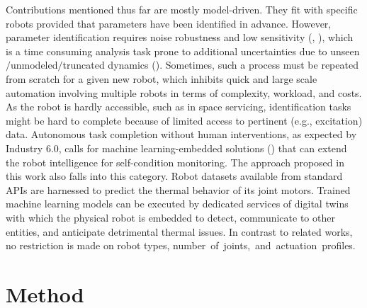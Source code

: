 \documentclass{ifacconf}
\begin{document}
Contributions mentioned thus far are mostly model-driven. They fit  with specific robots provided that parameters have been  identified in advance. However, parameter identification requires   noise robustness and low  sensitivity (\cite{zhang2024model}, \cite{de2024non}), which is a time consuming analysis task  prone to additional uncertainties due to unseen$\slash$unmodeled$\slash$truncated dynamics (\cite{shang2024general}). Sometimes, such a process must  be repeated from scratch for a given new robot, which inhibits quick and large scale automation involving multiple robots in terms of complexity, workload, and costs. As the robot is hardly accessible, such as in space servicing,  identification tasks might be hard to complete because of limited access to pertinent (e.g., excitation) data. Autonomous task completion without human interventions, as expected by Industry 6.0, calls for machine learning-embedded solutions (\cite{carayannis2024toward}) that can extend the robot intelligence for self-condition monitoring. The approach proposed in this work also falls into this category. Robot datasets available from standard APIs are harnessed to predict the thermal behavior of its joint motors. Trained machine learning models can be executed by dedicated services of  digital twins with which the physical robot is embedded to detect, communicate to other entities, and anticipate  detrimental thermal issues. In contrast to related works, no restriction is made  on  robot types, \mbox{number of joints, and actuation profiles.}


\section{Method}
\end{document}
